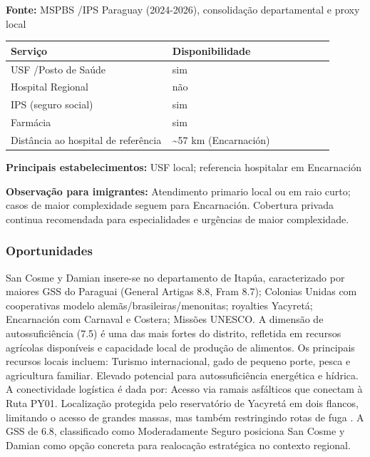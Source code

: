 \textbf{Fonte:} MSPBS /\allowbreak  IPS Paraguay (2024-2026), consolidação
departamental e proxy local

{\def\LTcaptype{none} %
\begin{longtable}{@{}>{\raggedright\arraybackslash}p{0.45\linewidth} >{\raggedright\arraybackslash}p{0.45\linewidth}@{}}
\toprule\noalign{}
Serviço & Disponibilidade \\
\midrule\noalign{}
\endhead
\bottomrule\noalign{}
\endlastfoot
USF /\allowbreak  Posto de Saúde & sim \\
Hospital Regional & não \\
IPS (seguro social) & sim \\
Farmácia & sim \\
Distância ao hospital de referência & \textasciitilde57 km
(Encarnación) \\
\end{longtable}
}

\textbf{Principais estabelecimentos:} USF local; referencia hospitalar
em Encarnación

\textbf{Observação para imigrantes:} Atendimento primario local ou em
raio curto; casos de maior complexidade seguem para Encarnación.
Cobertura privada continua recomendada para especialidades e urgências
de maior complexidade.
\newpage

\subsubsection*{Oportunidades}\label{oport-san-cosme-y-damian-0719}
San Cosme y Damian insere-se no departamento de Itapúa, caracterizado por maiores GSS do Paraguai (General Artigas 8.8, Fram 8.7); Colonias Unidas com cooperativas modelo alemãs/brasileiras/menonitas; royalties Yacyretá; Encarnación com Carnaval e Costera; Missões UNESCO. A dimensão de autossuficiência (7.5) é uma das mais fortes do distrito, refletida em recursos agrícolas disponíveis e capacidade local de produção de alimentos. Os principais recursos locais incluem: Turismo internacional, gado de pequeno porte, pesca e agricultura familiar. Elevado potencial para autossuficiência energética e hídrica. A conectividade logística é dada por: Acesso via ramais asfálticos que conectam à Ruta PY01. Localização protegida pelo reservatório de Yacyretá em dois flancos, limitando o acesso de grandes massas, mas também restringindo rotas de fuga . A GSS de 6.8, classificado como Moderadamente Seguro posiciona San Cosme y Damian como opção concreta para realocação estratégica no contexto regional.

